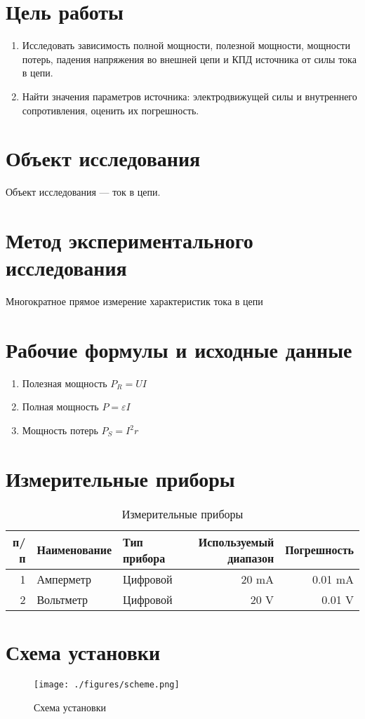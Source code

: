 \section{Цель работы}
\begin{enumerate}
	\item Исследовать зависимость полной мощности, полезной мощности,
	      мощности потерь, падения напряжения во внешней цепи и КПД
	      источника от силы тока в цепи.
	\item Найти значения параметров источника: электродвижущей силы и
	      внутреннего сопротивления, оценить их погрешность.
\end{enumerate}

\section{Объект исследования}
Объект исследования --- ток в цепи.

\section{Метод экспериментального исследования}
Многократное прямое измерение характеристик тока в цепи

\section{Рабочие формулы и исходные данные}
\begin{enumerate}
	\item Полезная мощность $ P_R = U I $
	\item Полная мощность $P = \varepsilon I$
	\item Мощность потерь $P_S = I^2 r$
\end{enumerate}

\section{Измерительные приборы}
\begin{table}[ht]
	\centering
	\begin{tabular}{r l l r r}
    \toprule
    \textnumero{} п/п & Наименование & Тип прибора & Используемый диапазон           & Погрешность                       \\
    \midrule
		1               & Амперметр    & Цифровой    & 20 \unit{\milli\ampere}         & 0.01 \unit{\milli\ampere}         \\
		2               & Вольтметр    & Цифровой    & 20 \hspace{0.16cm} \unit{\volt} & 0.01 \hspace{0.16cm} \unit{\volt} \\
    \bottomrule
	\end{tabular}
	\caption{Измерительные приборы}
\end{table}

\section{Схема установки}
\begin{figure}[H]
	\centering
  \texttt{[image: ./figures/scheme.png]}
	\caption{Схема установки}
\end{figure}
